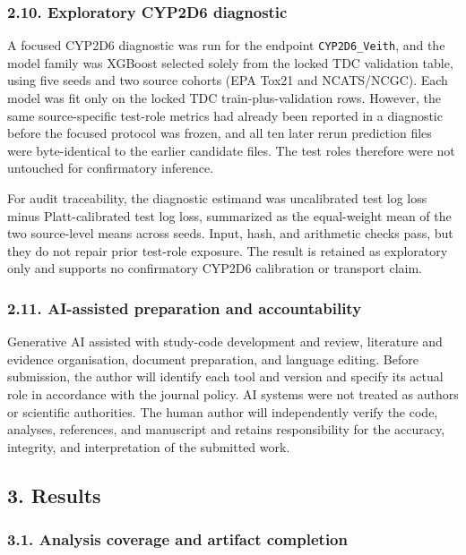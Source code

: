 \documentclass[
]{article}
\begin{document}
\subsubsection{2.10. Exploratory CYP2D6 diagnostic}\label{exploratory-cyp2d6-diagnostic}

A focused CYP2D6 diagnostic was run for the endpoint
\texttt{CYP2D6\_Veith}, and the model family was XGBoost selected solely from
the locked TDC validation table, using five seeds and two source cohorts (EPA
Tox21 and NCATS/NCGC). Each model was fit only on the locked TDC
train-plus-validation rows. However, the same source-specific test-role
metrics had already been reported in a diagnostic before the focused protocol
was frozen, and all ten later rerun prediction files were byte-identical to
the earlier candidate files. The test roles therefore were not untouched for
confirmatory inference.

For audit traceability, the diagnostic estimand was uncalibrated test log loss
minus Platt-calibrated test log loss, summarized as the equal-weight mean of
the two source-level means across seeds. Input, hash, and arithmetic checks
pass, but they do not repair prior test-role exposure. The result is retained
as exploratory only and supports no confirmatory CYP2D6 calibration or
transport claim.

\subsubsection{2.11. AI-assisted preparation and
accountability}\label{ai-assisted-preparation-and-accountability}

Generative AI assisted with study-code development and review, literature and
evidence organisation, document preparation, and language editing. Before
submission, the author will identify each tool and version and specify its
actual role in accordance with the journal policy. AI systems were not treated
as authors or scientific authorities. The human author will independently
verify the code, analyses, references, and manuscript and retains responsibility
for the accuracy, integrity, and interpretation of the submitted work.

\subsection{3. Results}\label{results}

\subsubsection{3.1. Analysis coverage and artifact
completion}\label{analysis-coverage-and-artifact-completion}
\end{document}
